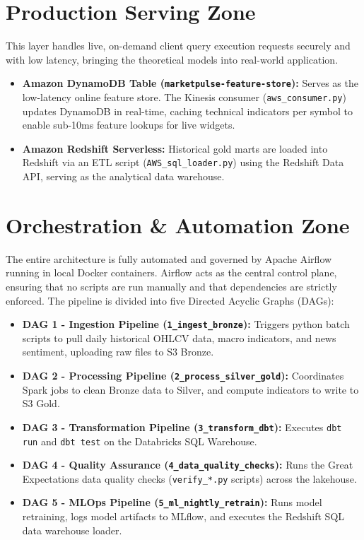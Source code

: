 \documentclass[11pt,a4paper]{article}
\begin{document}
\section{Production Serving Zone}
This layer handles live, on-demand client query execution requests securely and with low latency, bringing the theoretical models into real-world application.

\begin{itemize}[leftmargin=*]
    \item \textbf{Amazon DynamoDB Table (\texttt{marketpulse-feature-store}):} Serves as the low-latency online feature store. The Kinesis consumer (\texttt{aws\_consumer.py}) updates DynamoDB in real-time, caching technical indicators per symbol to enable sub-10ms feature lookups for live widgets.
    \item \textbf{Amazon Redshift Serverless:} Historical gold marts are loaded into Redshift via an ETL script (\texttt{AWS\_sql\_loader.py}) using the Redshift Data API, serving as the analytical data warehouse.
\end{itemize}

\section{Orchestration \& Automation Zone}
The entire architecture is fully automated and governed by Apache Airflow running in local Docker containers. Airflow acts as the central control plane, ensuring that no scripts are run manually and that dependencies are strictly enforced. The pipeline is divided into five Directed Acyclic Graphs (DAGs):

\begin{itemize}[leftmargin=*]
    \item \textbf{DAG 1 - Ingestion Pipeline (\texttt{1\_ingest\_bronze}):} Triggers python batch scripts to pull daily historical OHLCV data, macro indicators, and news sentiment, uploading raw files to S3 Bronze.
    \item \textbf{DAG 2 - Processing Pipeline (\texttt{2\_process\_silver\_gold}):} Coordinates Spark jobs to clean Bronze data to Silver, and compute indicators to write to S3 Gold.
    \item \textbf{DAG 3 - Transformation Pipeline (\texttt{3\_transform\_dbt}):} Executes \texttt{dbt run} and \texttt{dbt test} on the Databricks SQL Warehouse.
    \item \textbf{DAG 4 - Quality Assurance (\texttt{4\_data\_quality\_checks}):} Runs the Great Expectations data quality checks (\texttt{verify\_*.py} scripts) across the lakehouse.
    \item \textbf{DAG 5 - MLOps Pipeline (\texttt{5\_ml\_nightly\_retrain}):} Runs model retraining, logs model artifacts to MLflow, and executes the Redshift SQL data warehouse loader.
\end{itemize}
\end{document}
